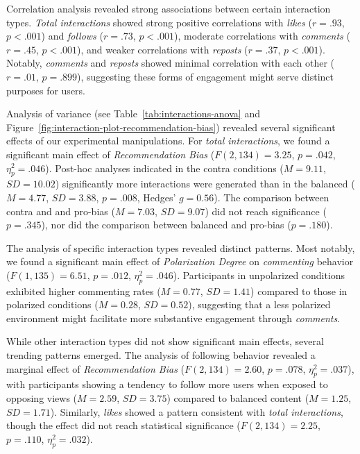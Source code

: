 Correlation analysis revealed strong associations between certain interaction types. \emph{Total interactions} showed strong positive correlations with \emph{likes} ($r = .93$, $p < .001$) and \emph{follows} ($r = .73$, $p < .001$), moderate correlations with \emph{comments} ($r = .45$, $p < .001$), and weaker correlations with \emph{reposts} ($r = .37$, $p < .001$). Notably, \emph{comments} and \emph{reposts} showed minimal correlation with each other ($r = .01$, $p = .899$), suggesting these forms of engagement might serve distinct purposes for users.





Analysis of variance (see Table~\ref{tab:interactions-anova} and Figure~\ref{fig:interaction-plot-recommendation-bias}) revealed several significant effects of our experimental manipulations. For \emph{total interactions}, we found a significant main effect of \emph{Recommendation Bias} ($F(2,134) = 3.25$, $p = .042$, $\eta^2_p  = .046$). Post-hoc analyses indicated in the contra conditions ($M = 9.11$, $SD = 10.02$) significantly more interactions were generated than in the balanced ($M = 4.77$, $SD = 3.88$, $p = .008$, Hedges' $g = 0.56$). The comparison between contra and and pro-bias ($M = 7.03$, $SD = 9.07$) did not reach significance ($p = .345$), nor did the comparison between balanced and pro-bias ($p = .180$).

The analysis of specific interaction types revealed distinct patterns. Most notably, we found a significant main effect of \emph{Polarization Degree} on \emph{commenting} behavior ($F(1,135) = 6.51$, $p = .012$, $\eta^2_p = .046$). Participants in unpolarized conditions exhibited higher commenting rates ($M = 0.77$, $SD = 1.41$) compared to those in polarized conditions ($M = 0.28$, $SD = 0.52$), suggesting that a less polarized environment might facilitate more substantive engagement through \emph{comments}.

While other interaction types did not show significant main effects, several trending patterns emerged. The analysis of following behavior revealed a marginal effect of \emph{Recommendation Bias} ($F(2,134) = 2.60$, $p = .078$, $\eta^2_p  = .037$), with participants showing a tendency to follow more users when exposed to opposing views ($M = 2.59$, $SD = 3.75$) compared to balanced content ($M = 1.25$, $SD = 1.71$). Similarly, \emph{likes} showed a pattern consistent with \emph{total interactions}, though the effect did not reach statistical significance ($F(2,134) = 2.25$, $p = .110$, $\eta^2_p  = .032$).


